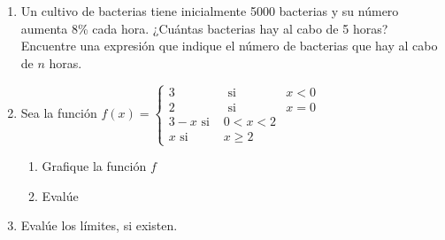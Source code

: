 \documentclass[10pt,twoside]{article}
\begin{document}
\begin{enumerate}
\item Un cultivo de bacterias tiene inicialmente 5000 bacterias y su número aumenta 8\% cada hora. ¿Cuántas bacterias hay al cabo de 5 horas? Encuentre una expresi\'{o}n que indique el n\'{u}mero de bacterias que hay al cabo de $n$ horas.
\item Sea la función $f(x)=\left\{\begin{array}{lcl}
3 & \mbox{ si } & x<0\\
2 & \mbox{ si } & x=0\\
3-x \mbox{ si } & 0<x<2\\
x \mbox{ si } & x\geq 2
\end{array}\right.$
\begin{enumerate}
\section*{L\'{i}mites}
\item Grafique la funci\'{o}n $f$
\item Eval\'{u}e
\begin{enumerate}
\end{enumerate}
\end{enumerate}
\item Evalúe los límites, si existen.
\begin{enumerate}
\end{enumerate}

\end{enumerate}
\end{document}
